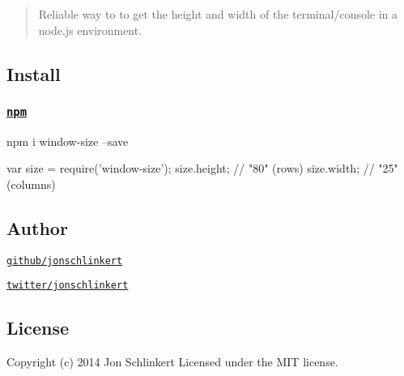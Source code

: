 \begin{quote}
Reliable way to to get the height and width of the terminal/console in a node.\+js environment. \end{quote}


\subsection*{Install}

\subsubsection*{\href{npmjs.org}{\tt npm}}


\begin{DoxyCode}
npm i window-size --save
\end{DoxyCode}



\begin{DoxyCode}
var size = require('window-size');
size.height; // "80" (rows)
size.width; // "25" (columns)
\end{DoxyCode}


\subsection*{Author}


\begin{DoxyItemize}
\item \href{https://github.com/jonschlinkert}{\tt github/jonschlinkert}
\item \href{http://twitter.com/jonschlinkert}{\tt twitter/jonschlinkert}
\end{DoxyItemize}

\subsection*{License}

Copyright (c) 2014 Jon Schlinkert Licensed under the M\+IT license. 